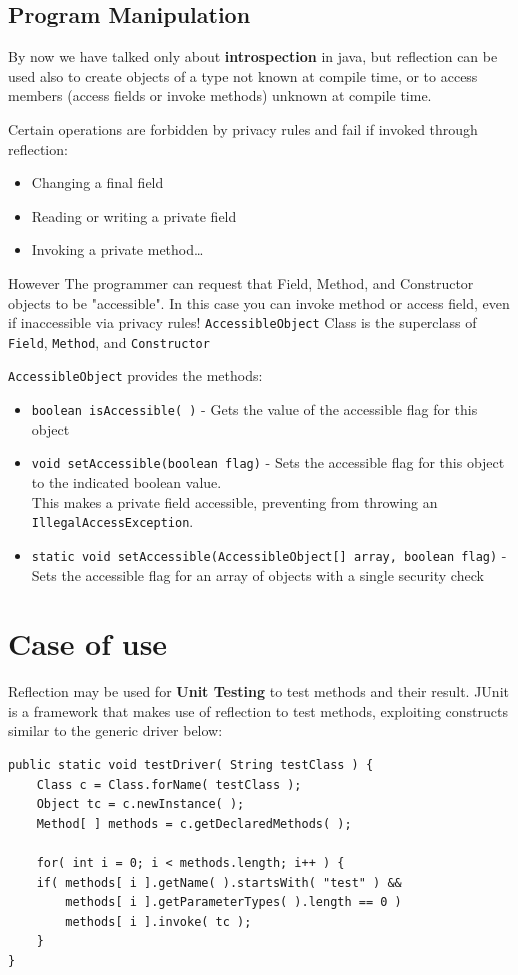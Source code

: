 \subsection{Program Manipulation}
By now we have talked only about \textbf{introspection} in java,
but reflection can be used also to create objects of a type not known at compile time,
or to access members (access fields or invoke methods) unknown at compile time.

{Certain operations are forbidden by privacy rules and fail if invoked through reflection:\ns
\begin{itemize}
	\item Changing a final field
	\item Reading or writing a private field
	\item Invoking a private method…
\end{itemize}}

However The programmer can request that Field, Method, and
Constructor objects to be "accessible".
In this case you can invoke method or access field, even if
inaccessible via privacy rules!
\lstinline|AccessibleObject| Class is the superclass of \lstinline|Field|,
\lstinline|Method|, and \lstinline|Constructor|

{\lstinline|AccessibleObject| provides the methods:\ns
\begin{itemize}
	\item \lstinline|boolean isAccessible( )| - Gets the value of the accessible flag for this object
	\item \lstinline|void setAccessible(boolean flag)| - Sets the accessible flag for this object to the indicated boolean value.\\
	This makes a private field accessible, preventing from throwing an \lstinline|IllegalAccessException|.
	\item \lstinline|static void setAccessible(AccessibleObject[] array, boolean flag)| - Sets the accessible flag for an array of objects with a single security check
\end{itemize}}

\section{Case of use}
Reflection may be used for \textbf{Unit Testing} to test methods and their result. JUnit is a framework that makes use of reflection to test methods, exploiting constructs similar to the generic driver below:

\begin{lstlisting}
public static void testDriver( String testClass ) {
    Class c = Class.forName( testClass );
    Object tc = c.newInstance( );
    Method[ ] methods = c.getDeclaredMethods( );

    for( int i = 0; i < methods.length; i++ ) {
    if( methods[ i ].getName( ).startsWith( "test" ) &&
        methods[ i ].getParameterTypes( ).length == 0 )
        methods[ i ].invoke( tc );
    }
}
\end{lstlisting}